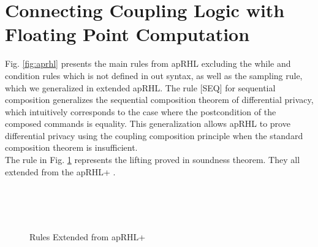 \documentclass[a4paper,11pt]{article}
\begin{document}
\section{
Connecting Coupling Logic
%
with Floating Point Computation
}
%
Fig. \ref{fig:aprhl} presents the main rules from apRHL excluding the while and condition rules which is not defined in out syntax, as well as the sampling rule, which we generalized in extended apRHL.
The rule [SEQ] for sequential composition generalizes the sequential composition theorem of differential privacy, which intuitively corresponds to the case where the postcondition of the composed commands is equality.
This generalization allows apRHL to prove differential privacy using the coupling composition principle when the standard composition theorem is insufficient.
\\
The rule in Fig. \ref{fig:aprhlplus} represents the lifting proved in soundness theorem. They all extended from the apRHL+ \cite{barthe2016proving}.
\begin{figure}[t]
\boxed{\vdash: \prog \times \prog \times \Phi \times \Phi}\\
\\
\\
\caption{Rules Extended from apRHL+}
\label{fig:aprhlplus}
\end{figure}
\end{document}
